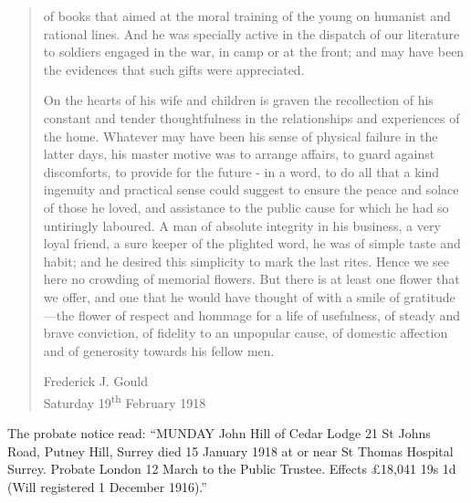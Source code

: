 \begin{quotation}
of books that aimed at the moral training of the young on humanist and rational lines. And he was specially active in the dispatch of our literature to soldiers engaged in the war, in camp or at the front; and may have been the evidences that such gifts were appreciated.

On the hearts of his wife and children is graven the recollection of his constant and tender thoughtfulness in the relationships and experiences of the home. Whatever may have been his sense of physical failure in the latter days, his master motive was to arrange affairs, to guard against discomforts, to provide for the future - in a word, to do all that a kind ingenuity and practical sense could suggest to ensure the peace and solace of those he loved, and assistance to the public cause for which he had so untiringly laboured. A man of absolute integrity in his business, a very loyal friend, a sure keeper of the plighted word, he was of simple taste and habit; and he desired this simplicity to mark the last rites. Hence we see here no crowding of memorial flowers. But there is at least one flower that we offer, and one that he would have thought of with a smile of gratitude---the flower of respect and hommage for a life of usefulness, of steady and brave conviction, of fidelity to an unpopular cause, of domestic affection and of generosity towards his fellow men.

Frederick J. Gould \\
Saturday 19\textsuperscript{th} February 1918
\end{quotation}

The probate notice read: ``MUNDAY John Hill of Cedar Lodge 21 St Johns Road, Putney Hill, Surrey died 15 January 1918 at or near St Thomas Hospital Surrey. Probate London 12 March to the Public Trustee. Effects \pounds18,041 19s 1d (Will registered 1 December 1916).''\cite{NationalProbateCalendar}
